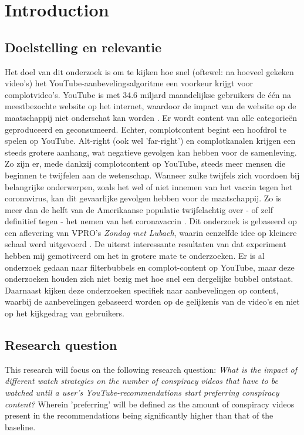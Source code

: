 \documentclass[../main.tex]{subfiles}
\begin{document}
\section{Introduction}
\subsection{Doelstelling en relevantie}
Het doel van dit onderzoek is om te kijken hoe snel (oftewel: na hoeveel gekeken video’s) het YouTube-aanbevelingsalgoritme een voorkeur krijgt voor complotvideo's. YouTube is met 34.6 miljard maandelijkse gebruikers de één na meestbezochte website op het internet, waardoor de impact van de website op de maatschappij niet onderschat kan worden \citep{neufeld_2021}. Er wordt content van alle categorieën geproduceerd en geconsumeerd. Echter, complotcontent begint een hoofdrol te spelen op YouTube. Alt-right (ook wel 'far-right') en complotkanalen krijgen een steeds grotere aanhang, wat negatieve gevolgen kan hebben voor de samenleving. Zo zijn er, mede dankzij complotcontent op YouTube, steeds meer mensen die beginnen te twijfelen aan de wetenschap. Wanneer zulke twijfels zich voordoen bij belangrijke onderwerpen, zoals het wel of niet innemen van het vaccin tegen het coronavirus, kan dit gevaarlijke gevolgen hebben voor de maatschappij. Zo is meer dan de helft van de Amerikaanse populatie twijfelachtig over - of zelf definitief tegen - het nemen van het coronavaccin \citep{rosenbaum2021escaping}. Dit onderzoek is gebaseerd op een aflevering van VPRO's \textit{Zondag met Lubach}, waarin eenzelfde idee op kleinere schaal werd uitgevoerd \citep{lubach_2020}. De uiterst interessante resultaten van dat experiment hebben mij gemotiveerd om het in grotere mate te onderzoeken. 
Er is al onderzoek gedaan naar filterbubbels en complot-content op YouTube, maar deze onderzoeken houden zich niet bezig met hoe snel een dergelijke bubbel ontstaat. Daarnaast kijken deze onderzoeken specifiek naar aanbevelingen op content, waarbij de aanbevelingen gebaseerd worden op de gelijkenis van de video’s en niet op het kijkgedrag van gebruikers. 

\subsection{Research question}
This research will focus on the following research question:
\textit{What is the impact of different watch strategies on the number of conspiracy videos that have to be watched until a user's YouTube-recommendations start preferring conspiracy content?} Wherein 'preferring' will be defined as the amount of conspiracy videos present in the recommendations being significantly higher than that of the baseline.
\end{document}
